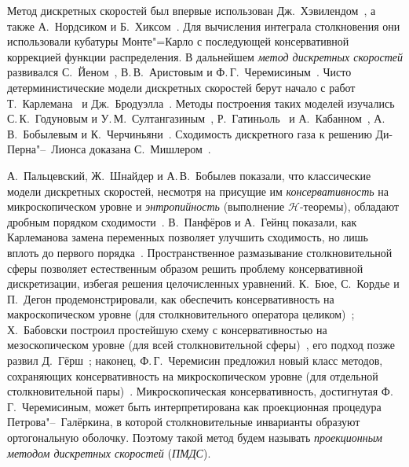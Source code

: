 Метод дискретных скоростей был впервые использован Дж.~Хэвилендом~\autocite{Haviland1965},
а также А.~Нордсиком и Б.~Хиксом~\autocite{Nordsieck1966}.
Для вычисления интеграла столкновения они использовали кубатуры Монте"=Карло с последующей
консервативной коррекцией функции распределения.
В дальнейшем \emph{метод дискретных скоростей} развивался С.~Йеном~\autocite{Yen1984},
В.\,В.~Аристовым и Ф.\,Г.~Черемисиным~\autocite{Tcheremissine1980}.
Чисто детерминистические модели дискретных скоростей берут начало с работ
Т.~Карлемана~\autocite{Carleman1957} и Дж.~Бродуэлла~\autocite{Broadwell1964shock, Broadwell1964shear}.
Методы построения таких моделей изучались С.\,К.~Годуновым и У.\,М.~Султангазиным~\autocite{Sultangazin1971},
Р.~Гатиньоль~\autocite{Gatignol1975} и А.~Кабанном~\autocite{Cabannes1980},
А.\,В.~Бобылевым и К.~Черчиньяни~\autocite{Bobylev1999dvm}.
Сходимость дискретного газа к решению Ди-Перна"--~Лионса доказана С.~Мишлером~\autocite{Mischler1997}.

А.~Пальцевский, Ж.~Шнайдер и А.\,В.~Бобылев показали, что классические модели дискретных скоростей,
несмотря на присущие им \emph{консервативность} на микроскопическом уровне и \emph{энтропийность}
(выполнение \(\mathcal{H}\)-теоремы), обладают дробным порядком сходимости~\autocite{Palczewski1997}.
В.~Панфёров и А.~Гейнц показали, как Карлеманова замена переменных
позволяет улучшить сходимость, но лишь вплоть до первого порядка~\autocite{Panferov2002}.
Пространственное размазывание столкновительной сферы позволяет естественным образом
решить проблему консервативной дискретизации, избегая решения целочисленных уравнений.
К.~Бюе, С.~Кордье и П.~Дегон продемонстрировали, как обеспечить консервативность на макроскопическом уровне
(для столкновительного оператора целиком)~\autocite{Buet1998};
Х.~Бабовски построил простейшую схему с консервативностью на мезоскопическом уровне
(для всей столкновительной сферы)~\autocite{Babovsky1998}, его подход позже развил Д.~Гёрш~\autocite{Goersch2002};
наконец, Ф.\,Г.~Черемисин предложил новый класс методов, сохраняющих консервативность на микроскопическом уровне
(для отдельной столкновительной пары)~\autocite{Tcheremissine1997}.
Микроскопическая консервативность, достигнутая Ф.\,Г.~Черемисиным, может быть интерпретирована
как проекционная процедура Петрова"--~Галёркина,
в которой столкновительные инварианты образуют ортогональную оболочку.
Поэтому такой метод будем называть \emph{проекционным методом дискретных скоростей} (\emph{ПМДС}).

